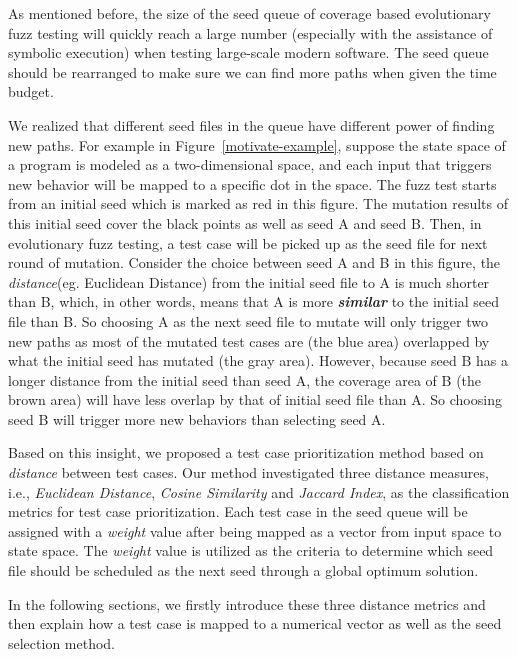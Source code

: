 As mentioned before, the size of the seed queue of coverage based evolutionary fuzz testing will quickly reach a large number (especially with the assistance of symbolic execution) when testing large-scale modern software. The seed queue should be rearranged to make sure we can find more paths when given the time budget.


We realized that different seed files in the queue have different power of finding new paths. For example in Figure~\ref{motivate-example}, suppose the state space of a program is modeled as a two-dimensional space, and each input that triggers new behavior will be mapped to a specific dot in the space. The fuzz test starts from an initial seed which is marked as red in this figure. The mutation results of this initial seed cover the black points as well as seed A and seed B. Then, in evolutionary fuzz testing, a test case will be picked up as the seed file for next round of mutation. 
Consider the choice between seed A and B in this figure, the \emph{distance}(eg. Euclidean Distance) from the initial seed file to A is much shorter than B, which, in other words, means that A is more \textbf{\textit{similar}} to the initial seed file than B. So choosing A as the next seed file to mutate will only trigger two new paths as most of the mutated test cases are (the blue area) overlapped by what the initial seed has mutated (the gray area). However, because seed B has a longer distance from the initial seed than seed A, the coverage area of B (the brown area) will have less overlap by that of initial seed file than A. So choosing seed B will trigger more new behaviors than selecting seed A.


Based on this insight, we proposed a test case prioritization method based on \emph{distance} between test cases. Our method investigated three distance measures, i.e., \textit{Euclidean Distance}, \textit{Cosine Similarity} and \textit{Jaccard Index}, as the classification metrics for test case prioritization. Each test case in the seed queue will be assigned with a \emph{weight} value after being mapped as a vector from input space to state space. The \emph{weight} value is utilized as the criteria to determine which seed file should be scheduled as the next seed through a global optimum solution.

In the following sections, we firstly introduce these three distance metrics and then explain how a test case is mapped to a numerical vector as well as the seed selection method.

